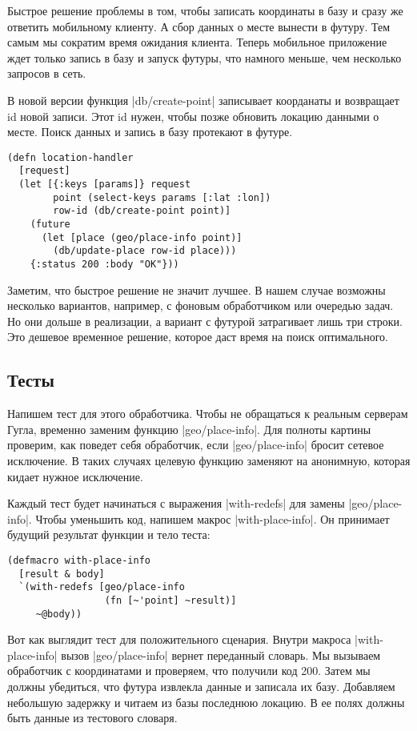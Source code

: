 {{{{{{{{Быстрое решение проблемы в том, чтобы записать координаты в базу и сразу же
ответить мобильному клиенту. А сбор данных о месте вынести в футуру. Тем самым
мы сократим время ожидания клиента. Теперь мобильное приложение ждет только
запись в базу и запуск футуры, что намного меньше, чем несколько запросов в
сеть.

В новой версии функция \spverb|db/create-point| записывает коорданаты и возвращает id
новой записи. Этот id нужен, чтобы позже обновить локацию данными о месте. Поиск
данных и запись в базу протекают в футуре.

\begin{verbatim}
(defn location-handler
  [request]
  (let [{:keys [params]} request
        point (select-keys params [:lat :lon])
        row-id (db/create-point point)]
    (future
      (let [place (geo/place-info point)]
        (db/update-place row-id place)))
    {:status 200 :body "OK"}))
\end{verbatim}

Заметим, что быстрое решение не значит лучшее. В нашем случае возможны несколько
вариантов, например, с фоновым обработчиком или очередью задач. Но они дольше в
реализации, а вариант с футурой затрагивает лишь три строки. Это дешевое
временное решение, которое даст время на поиск оптимального.

\subsection{Тесты}

Напишем тест для этого обработчика. Чтобы не обращаться к реальным серверам
Гугла, временно заменим функцию \spverb|geo/place-info|. Для полноты картины проверим,
как поведет себя обработчик, если \spverb|geo/place-info| бросит сетевое исключение. В
таких случаях целевую функцию заменяют на анонимную, которая кидает нужное
исключение.

Каждый тест будет начинаться с выражения \spverb|with-redefs| для замены
\spverb|geo/place-info|. Чтобы уменьшить код, напишем макрос \spverb|with-place-info|. Он
принимает будущий результат функции и тело теста:

\begin{verbatim}
(defmacro with-place-info
  [result & body]
  `(with-redefs [geo/place-info
                 (fn [~'point] ~result)]
     ~@body))
\end{verbatim}

Вот как выглядит тест для положительного сценария. Внутри макроса
\spverb|with-place-info| вызов \spverb|geo/place-info| вернет переданный словарь. Мы вызываем
обработчик с координатами и проверяем, что получили код 200. Затем мы должны
убедиться, что футура извлекла данные и записала их базу. Добавляем небольшую
задержку и читаем из базы последнюю локацию. В ее полях должны быть данные из
тестового словаря.

}}}}}}}}
